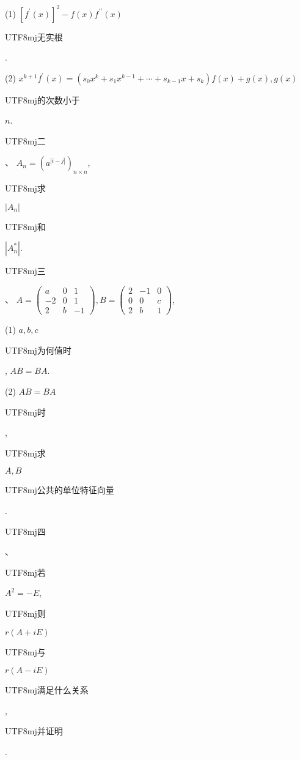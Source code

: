 \documentclass[10pt]{article}
\begin{document}
(1) $\left[f^{\prime}(x)\right]^{2}-f(x) f^{\prime \prime}(x)$ \begin{CJK}{UTF8}{mj}无实根\end{CJK}.

(2) $x^{k+1} f^{\prime}(x)=\left(s_{0} x^{k}+s_{1} x^{k-1}+\cdots+s_{k-1} x+s_{k}\right) f(x)+g(x), g(x)$ \begin{CJK}{UTF8}{mj}的次数小于\end{CJK} $n$.

\begin{CJK}{UTF8}{mj}二\end{CJK}、 $A_{n}=\left(a^{|i-j|}\right)_{n \times n}$, \begin{CJK}{UTF8}{mj}求\end{CJK} $\left|A_{n}\right|$ \begin{CJK}{UTF8}{mj}和\end{CJK} $\left|A_{n}^{*}\right|$.

\begin{CJK}{UTF8}{mj}三\end{CJK}、 $A=\left(\begin{array}{ccc}a & 0 & 1 \\ -2 & 0 & 1 \\ 2 & b & -1\end{array}\right), B=\left(\begin{array}{ccc}2 & -1 & 0 \\ 0 & 0 & c \\ 2 & b & 1\end{array}\right)$,

(1) $a, b, c$ \begin{CJK}{UTF8}{mj}为何值时\end{CJK}, $A B=B A$.

(2) $A B=B A$ \begin{CJK}{UTF8}{mj}时\end{CJK}, \begin{CJK}{UTF8}{mj}求\end{CJK} $A, B$ \begin{CJK}{UTF8}{mj}公共的单位特征向量\end{CJK}.

\begin{CJK}{UTF8}{mj}四\end{CJK}、\begin{CJK}{UTF8}{mj}若\end{CJK} $A^{2}=-E$, \begin{CJK}{UTF8}{mj}则\end{CJK} $r(A+i E)$ \begin{CJK}{UTF8}{mj}与\end{CJK} $r(A-i E)$ \begin{CJK}{UTF8}{mj}满足什么关系\end{CJK}, \begin{CJK}{UTF8}{mj}并证明\end{CJK}.
\end{document}
